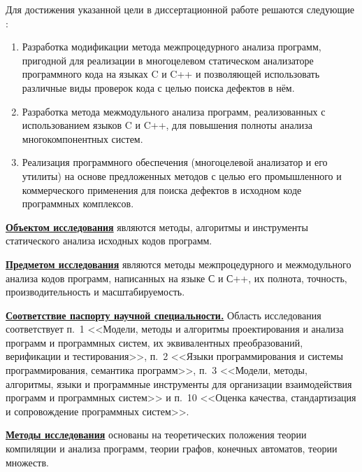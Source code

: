 Для достижения указанной цели в диссертационной работе решаются следующие {\tasks}:
\begin{enumerate}[leftmargin=1em]
  \item Разработка модификации метода межпроцедурного анализа программ, пригодной для реализации в многоцелевом статическом анализаторе программного кода на языках C и C++ и позволяющей использовать различные виды проверок кода с целью поиска дефектов в нём.
  \item Разработка метода межмодульного анализа программ, реализованных с использованием языков C и C++, для повышения полноты анализа многокомпонентных систем.
  \item Реализация программного обеспечения (многоцелевой анализатор и его утилиты) на основе предложенных методов с целью его промышленного и коммерческого применения для поиска дефектов в исходном коде программных комплексов.
\end{enumerate}

\underline{\textbf{Объектом исследования}} являются методы, алгоритмы и инструменты статического анализа исходных кодов программ.

\underline{\textbf{Предметом исследования}} являются методы межпроцедурного и межмодульного анализа кодов программ, написанных на языке С и С++, их полнота, точность, производительность и масштабируемость.

\underline{\textbf{Соответствие паспорту научной специальности.}} Область исследования соответствует п.~1 <<Модели, методы и алгоритмы проектирования и анализа программ и программных систем, их эквивалентных преобразований, верификации и тестирования>>, п.~2 <<Языки программирования и системы программирования, семантика программ>>, п.~3 <<Модели, методы, алгоритмы, языки и программные инструменты для организации взаимодействия программ и программных систем>> и п.~10 <<Оценка качества, стандартизация и сопровождение программных систем>>.

\underline{\textbf{Методы исследования}} основаны на теоретических положения теории компиляции и анализа программ, теории графов, конечных автоматов, теории множеств.

\novelty

